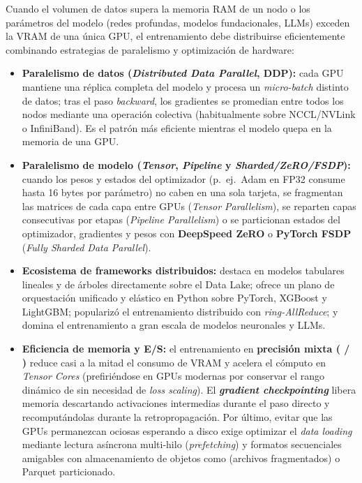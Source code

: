 Cuando el volumen de datos supera la memoria RAM de un nodo o los parámetros del modelo (redes profundas, modelos fundacionales, LLMs) exceden la VRAM de una única GPU, el entrenamiento debe distribuirse eficientemente combinando estrategias de paralelismo y optimización de hardware:

\begin{itemize}
  \item \textbf{Paralelismo de datos (\textit{Distributed Data Parallel}, DDP):} cada GPU mantiene una réplica completa del modelo y procesa un \textit{micro-batch} distinto de datos; tras el paso \textit{backward}, los gradientes se promedian entre todos los nodos mediante una operación colectiva  (habitualmente sobre NCCL/NVLink o InfiniBand). Es el patrón más eficiente mientras el modelo quepa en la memoria de una GPU.
  \item \textbf{Paralelismo de modelo (\textit{Tensor}, \textit{Pipeline} y \textit{Sharded/ZeRO/FSDP}):} cuando los pesos y estados del optimizador (p.~ej.\ Adam en FP32 consume hasta 16 bytes por parámetro) no caben en una sola tarjeta, se fragmentan las matrices de cada capa entre GPUs (\textit{Tensor Parallelism}), se reparten capas consecutivas por etapas (\textit{Pipeline Parallelism}) o se particionan estados del optimizador, gradientes y pesos con \textbf{DeepSpeed ZeRO} o \textbf{PyTorch FSDP} (\textit{Fully Sharded Data Parallel}).
  \item \textbf{Ecosistema de frameworks distribuidos:}  destaca en modelos tabulares lineales y de árboles directamente sobre el Data Lake;  ofrece un plano de orquestación unificado y elástico en Python sobre PyTorch, XGBoost y LightGBM;  popularizó el entrenamiento distribuido con \textit{ring-AllReduce}; y  domina el entrenamiento a gran escala de modelos neuronales y LLMs.
  \item \textbf{Eficiencia de memoria y E/S:} el entrenamiento en \textbf{precisión mixta ( / )} reduce casi a la mitad el consumo de VRAM y acelera el cómputo en \textit{Tensor Cores} (prefiriéndose  en GPUs modernas por conservar el rango dinámico de  sin necesidad de \textit{loss scaling}). El \textbf{\textit{gradient checkpointing}} libera memoria descartando activaciones intermedias durante el paso directo y recomputándolas durante la retropropagación. Por último, evitar que las GPUs permanezcan ociosas esperando a disco exige optimizar el \textit{data loading} mediante lectura asíncrona multi-hilo (\textit{prefetching}) y formatos secuenciales amigables con almacenamiento de objetos como  (archivos  fragmentados) o Parquet particionado.
\end{itemize}

